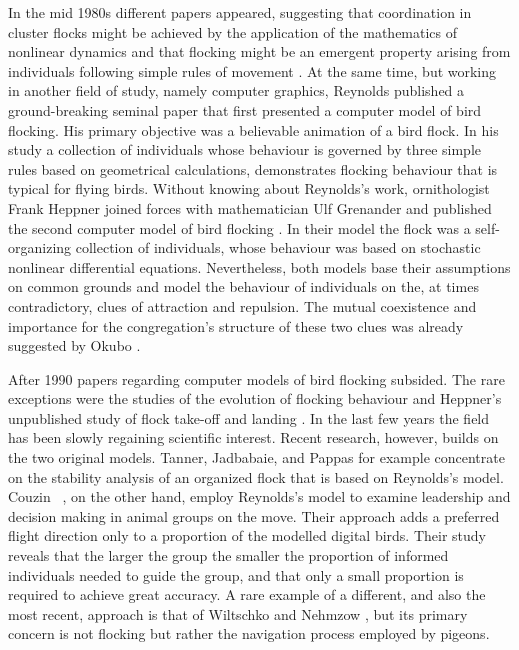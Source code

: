 In the mid 1980s different papers appeared, suggesting that coordination in cluster flocks might be achieved by the application of the mathematics of nonlinear dynamics \cite{okubo:1986} and that flocking might be an emergent property arising from individuals following simple rules of movement \cite{heppner:1987}. At the same time, but working in another field of study, namely computer graphics, Reynolds \cite{reynolds:1987} published a ground-breaking seminal paper that first presented a computer model of bird flocking. His primary objective was a believable animation of a bird flock. In his study a collection of individuals whose behaviour is governed by three simple rules based on geometrical calculations, demonstrates flocking behaviour that is typical for flying birds. Without knowing about Reynolds's work, ornithologist Frank Heppner joined forces with mathematician Ulf Grenander and published the second computer model of bird flocking \cite{heppner:1990}. In their model the flock was a self-organizing collection of individuals, whose behaviour was based on stochastic nonlinear differential equations. Nevertheless, both models base their assumptions on common grounds and model the behaviour of individuals on the, at times contradictory, clues of attraction and repulsion. The mutual coexistence and importance for the congregation's structure of these two clues was already suggested by Okubo \cite{okubo:1980}.

After 1990 papers regarding computer models of bird flocking subsided. The rare exceptions were the studies of the evolution of flocking behaviour \cite{reynolds:1993a,reynolds:1993b,reynolds:1994,spector:2002,spector:2003} and Heppner's unpublished study of flock take-off and landing \cite{heppner:1997}. In the last few years the field has been slowly regaining scientific interest. Recent research, however, builds on the two original models. Tanner, Jadbabaie, and Pappas \cite{tanner:2003a,tanner:2003b} for example concentrate on the stability analysis of an organized flock that is based on Reynolds's model. Couzin \etal\ \cite{couzin:2005}, on the other hand, employ Reynolds's model to examine leadership and decision making in animal groups on the move. Their approach adds a preferred flight direction only to a proportion of the modelled digital birds. Their study reveals that the larger the group the smaller the proportion of informed individuals needed to guide the group, and that only a small proportion is required to achieve great accuracy. A rare example of a different, and also the most recent, approach is that of Wiltschko and Nehmzow \cite{wiltschko:2005}, but its primary concern is not flocking but rather the navigation process employed by pigeons. 


